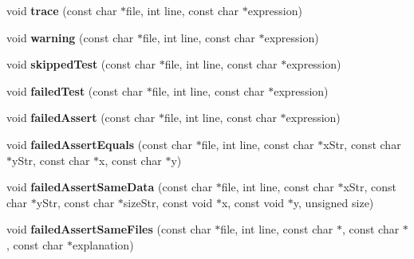 \begin{DoxyCompactItemize}
\item 
\hypertarget{classCxxTest_1_1ErrorFormatter_ad0fd347bdbc3ab84b740efd03a237125}{void {\bfseries trace} (const char $\ast$file, int line, const char $\ast$expression)}\label{classCxxTest_1_1ErrorFormatter_ad0fd347bdbc3ab84b740efd03a237125}

\item 
\hypertarget{classCxxTest_1_1ErrorFormatter_a14de8269504c13f1fa018d7c2a8ba639}{void {\bfseries warning} (const char $\ast$file, int line, const char $\ast$expression)}\label{classCxxTest_1_1ErrorFormatter_a14de8269504c13f1fa018d7c2a8ba639}

\item 
\hypertarget{classCxxTest_1_1ErrorFormatter_a194564b43f7afc8fc0e06cd976813a92}{void {\bfseries skipped\-Test} (const char $\ast$file, int line, const char $\ast$expression)}\label{classCxxTest_1_1ErrorFormatter_a194564b43f7afc8fc0e06cd976813a92}

\item 
\hypertarget{classCxxTest_1_1ErrorFormatter_ae8d8bc67f9d194e8f6357ee0e853ed49}{void {\bfseries failed\-Test} (const char $\ast$file, int line, const char $\ast$expression)}\label{classCxxTest_1_1ErrorFormatter_ae8d8bc67f9d194e8f6357ee0e853ed49}

\item 
\hypertarget{classCxxTest_1_1ErrorFormatter_a745afae529869c8718bab3567e0d2d27}{void {\bfseries failed\-Assert} (const char $\ast$file, int line, const char $\ast$expression)}\label{classCxxTest_1_1ErrorFormatter_a745afae529869c8718bab3567e0d2d27}

\item 
\hypertarget{classCxxTest_1_1ErrorFormatter_aef0fb796b7fb3afc4e625b4f8f489740}{void {\bfseries failed\-Assert\-Equals} (const char $\ast$file, int line, const char $\ast$x\-Str, const char $\ast$y\-Str, const char $\ast$x, const char $\ast$y)}\label{classCxxTest_1_1ErrorFormatter_aef0fb796b7fb3afc4e625b4f8f489740}

\item 
\hypertarget{classCxxTest_1_1ErrorFormatter_ad51758eb24a74031d2b7d42372f8dcb6}{void {\bfseries failed\-Assert\-Same\-Data} (const char $\ast$file, int line, const char $\ast$x\-Str, const char $\ast$y\-Str, const char $\ast$size\-Str, const void $\ast$x, const void $\ast$y, unsigned size)}\label{classCxxTest_1_1ErrorFormatter_ad51758eb24a74031d2b7d42372f8dcb6}

\item 
\hypertarget{classCxxTest_1_1ErrorFormatter_aed7b9a1918cfdd72f966b41ae6023779}{void {\bfseries failed\-Assert\-Same\-Files} (const char $\ast$file, int line, const char $\ast$, const char $\ast$, const char $\ast$explanation)}\label{classCxxTest_1_1ErrorFormatter_aed7b9a1918cfdd72f966b41ae6023779}


\end{DoxyCompactItemize}
